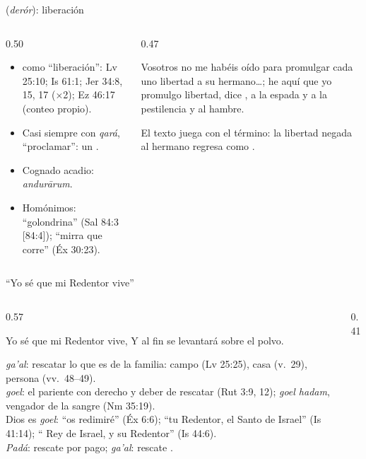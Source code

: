 \begin{frame}{ (\emph{derór}): liberación}
\begin{columns}[c,onlytextwidth]
\begin{column}{0.50\textwidth}\small
\begin{itemize}
\item {} como ``liberación'': Lv 25:10; Is 61:1; Jer 34:8, 15, 17 (×2); Ez 46:17 (conteo propio).
\item Casi siempre con \emph{qará}, ``proclamar'': un .
\item Cognado acadio: \emph{andurārum}.
\item Homónimos:  ``golondrina'' (Sal 84:3 [84:4]);  ``mirra que corre'' (Éx 30:23).
\end{itemize}
\end{column}
\begin{column}{0.47\textwidth}
\begin{cita}Vosotros no me habéis oído para promulgar cada uno libertad a su hermano\ldots{}; he aquí que yo promulgo libertad, dice \SENOR, a la espada y a la pestilencia y al hambre.\end{cita}
\scriptsize El texto juega con el término: la libertad negada al hermano regresa como .
\end{column}
\end{columns}
\end{frame}

\begin{frame}{``Yo sé que mi Redentor vive''}
\begin{columns}[c,onlytextwidth]
\begin{column}{0.57\textwidth}
\begin{cita}Yo sé que mi Redentor vive, Y al fin se levantará sobre el polvo.\end{cita}
\scriptsize\RaggedRight
{} \emph{ga'al}: rescatar lo que es de la familia: campo (Lv 25:25), casa (v.~29), persona (vv.~48--49).\\[2pt]
 \emph{goel}: el pariente con derecho y deber de rescatar (Rut 3:9, 12); \emph{goel hadam}, vengador de la sangre (Nm 35:19).\\[2pt]
Dios es \emph{goel}: ``os redimiré'' (Éx 6:6); ``tu Redentor, el Santo de Israel'' (Is 41:14); ``\SENOR{} Rey de Israel, y su Redentor'' (Is 44:6).\\[2pt]
\emph{Padá}: rescate por pago; \emph{ga'al}: rescate .
\end{column}
\begin{column}{0.41\textwidth}\end{column}
\end{columns}
\end{frame}

